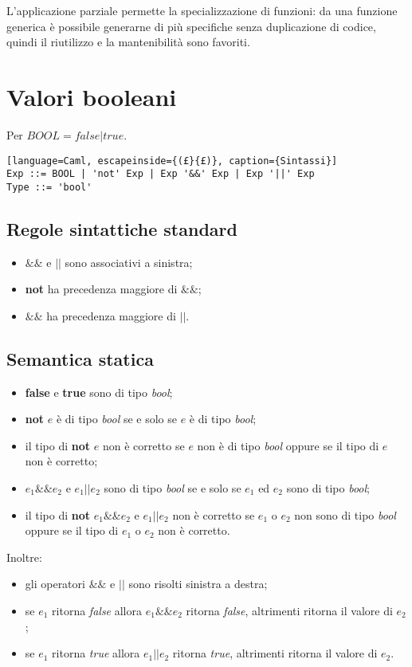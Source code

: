 L'applicazione parziale permette la specializzazione di funzioni: da una
funzione generica è possibile generarne di più specifiche senza
duplicazione di codice, quindi il riutilizzo e la mantenibilità sono
favoriti.

\section{Valori booleani}
Per $BOOL=false|true$.
\begin{lstlisting}[language=Caml, escapeinside={(£}{£)}, caption={Sintassi}]
Exp ::= BOOL | 'not' Exp | Exp '&&' Exp | Exp '||' Exp
Type ::= 'bool'
\end{lstlisting}

\subsection{Regole sintattiche standard}
\begin{itemize}
  \item $\&\&$ e $||$ sono associativi a sinistra;
  \item \textbf{not} ha precedenza maggiore di $\&\&$;
  \item $\&\&$ ha precedenza maggiore di $||$.
\end{itemize}

\subsection{Semantica statica}
\begin{itemize}
  \item \textbf{false} e \textbf{true} sono di tipo \emph{bool};
  \item \textbf{not} $e$ è di tipo \emph{bool} se e solo se $e$ è di tipo
    \emph{bool};
  \item il tipo di \textbf{not} $e$ non è corretto se $e$ non è di tipo
    \emph{bool} oppure se il tipo di $e$ non è corretto;
  \item $e_1\&\&e_2$ e $e_1||e_2$ sono di tipo \emph{bool} se e solo se $e_1$
    ed $e_2$ sono di tipo \emph{bool};
  \item il tipo di \textbf{not} $e_1\&\&e_2$ e $e_1||e_2$ non è corretto se
    $e_1$ o $e_2$ non sono di tipo \emph{bool} oppure se il tipo di $e_1$ o
    $e_2$ non è corretto.
\end{itemize}


Inoltre:
\begin{itemize}
  \item gli operatori $\&\&$ e $||$ sono risolti sinistra a destra;
  \item se $e_1$ ritorna \emph{false} allora $e_1\&\&e_2$ ritorna
    \emph{false}, altrimenti ritorna il valore di $e_2$;
  \item se $e_1$ ritorna \emph{true} allora $e_1||e_2$ ritorna \emph{true},
    altrimenti ritorna il valore di $e_2$.
\end{itemize}

